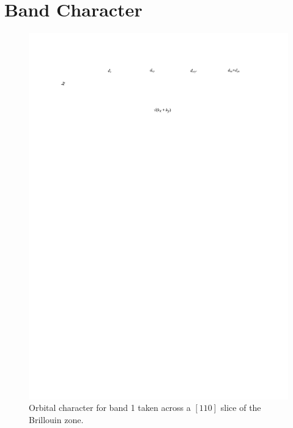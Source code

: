 
\chapter{\BaFeP{} Band Character}
\label{Appendix:BandCharacter110Slices}

\begin{figure}[h!]
    \begin{center}
        \includegraphics[scale=0.7]{Chapter-dHvABaFe2P2/Figures/AngleDepMeasurements/BandCharacterPlot/Band1_110Slice_BandCharacter}
        \caption{Orbital character for band 1 taken across a $[110]$ slice of the Brillouin zone.}
        \label{Fig:Appendix:BandCharacter110Band1}
    \end{center}
\end{figure}

